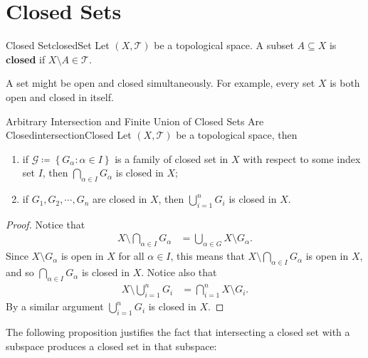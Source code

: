 \documentclass[math]{amznotes}
\theoremstyle{remark}
\begin{document}
\section{Closed Sets}
\begin{dfnbox}{Closed Set}{closedSet}
    Let $\left(X, \mathcal{T}\right)$ be a topological space. A subset $A \subseteq X$ is {\color{red} \textbf{closed}} if $X \setminus A \in \mathcal{T}$.
\end{dfnbox}
A set might be open and closed simultaneously. For example, every set $X$ is both open and closed in itself.
\begin{probox}{\small Arbitrary Intersection and Finite Union of Closed Sets Are Closed}{intersectionClosed}
    Let $\left(X, \mathcal{T}\right)$ be a topological space, then 
    \begin{enumerate}
        \item if $\mathcal{G} \coloneqq \left\{G_{\alpha} \colon \alpha \in I\right\}$ is a family of closed set in $X$ with respect to some index set $I$, then $\bigcap_{\alpha \in I}G_{\alpha}$ is closed in $X$;
        \item if $G_1, G_2, \cdots, G_n$ are closed in $X$, then $\bigcup_{i = 1}^nG_i$ is closed in $X$.
    \end{enumerate}
    \tcblower
    \begin{proof}
        Notice that
        \begin{align*}
            X \setminus \bigcap_{\alpha \in I}G_{\alpha} & = \bigcup_{\alpha \in G} X \setminus G_{\alpha}.
        \end{align*}
        Since $X \setminus G_{\alpha}$ is open in $X$ for all $\alpha \in I$, this means that $X \setminus \bigcap_{\alpha \in I}G_{\alpha}$ is open in $X$, and so $\bigcap_{\alpha \in I}G_{\alpha}$ is closed in $X$. Notice also that 
        \begin{align*}
            X \setminus \bigcup_{i = 1}^nG_i & = \bigcap_{i = 1}^nX \setminus G_i.
        \end{align*}
        By a similar argument $\bigcup_{i = 1}^nG_i$ is closed in $X$.
    \end{proof}
\end{probox}
The following proposition justifies the fact that intersecting a closed set with a subspace produces a closed set in that subspace:
\end{document}
